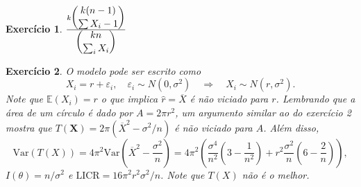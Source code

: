 \documentclass[letter,11pt]{article}
\newtheorem{exer}{Exercício}
\newcommand{\E}{\mathbb {E}}
\newcommand{\var}{\mathrm{Var}}
\newcommand{\hx}{\overline{X}}
\newcommand{\te}{\theta}
\newcommand{\bs}{\boldsymbol}
\begin{document}
\begin{exer} \rm
$\frac{k\dbinom{k(n-1)}{\sum X_i -1}}{\dbinom{kn}{\sum_i X_i}}$
\end{exer}


\begin{exer} \rm 
O modelo pode ser escrito como
\[X_i=r+\varepsilon_i,\quad\varepsilon_i\sim N(0,\sigma^2)\quad\Longrightarrow\quad X_i\sim N(r,\sigma^2).\]
Note que $\E(X_i)=r$ o que implica $\hat r=\hx$ é não viciado para $r$. Lembrando que a área de um círculo é dado por $A=2\pi r^2$, um argumento similar ao do exercício 2 mostra que $T(\bs X)=2\pi(\hx^2-\sigma^2/n)$ é não viciado para $A$. Além disso,
\[\var(T(X))=4\pi^2\var\left(\hx^2-\frac{\sigma^2}{n}\right)=4\pi^2\left(\frac{\sigma^4}{n^2}(3-\frac{1}{n^2})+r^2\frac{\sigma^2}{n}(6-\frac{2}{n})\right),\]
 $I(\te)=n/\sigma^2$ e $\mathrm{LICR}=16\pi^2r^2\sigma^2/n$. Note que $T(X)$ não é o melhor.
\end{exer}
\end{document}
